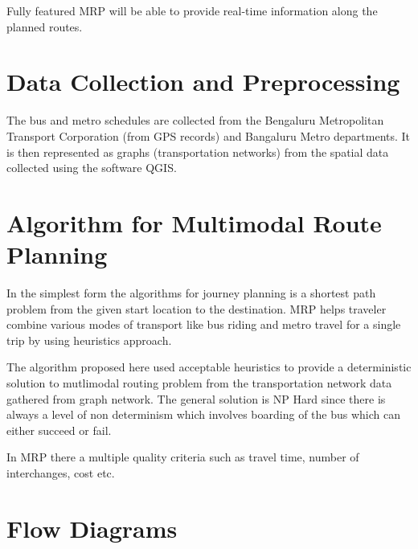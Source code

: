 \documentclass[12pt,a4paper]{article}
\begin{document}
Fully featured MRP will be able to provide real-time information along the planned routes.

\section{Data Collection and Preprocessing}

The bus and metro schedules are collected from the Bengaluru Metropolitan Transport Corporation (from GPS records) and Bangaluru Metro departments. It is then represented as graphs (transportation networks) from the spatial data collected using the software QGIS. 


\section{Algorithm for Multimodal Route Planning}

In the simplest form the algorithms for journey planning is a shortest path problem from the given start location to the destination. MRP helps traveler combine various modes of transport like bus riding and metro travel for a single trip by using heuristics approach. 

The algorithm proposed here used acceptable heuristics to provide a deterministic solution to mutlimodal routing problem from the transportation network data gathered from  graph network. The general solution is NP Hard since there is always a level of non determinism which involves boarding of the bus which can either succeed or fail.

In MRP there a multiple quality criteria such as travel time, number of interchanges, cost etc.



\section{Flow Diagrams}
\end{document}
